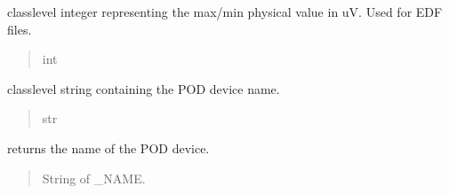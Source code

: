 \documentclass[letterpaper,10pt,english]{sphinxmanual}
\begin{document}
\begin{fulllineitems}
\begin{fulllineitems}
\end{fulllineitems}


\begin{fulllineitems}
\label{\detokenize{Setup_8401HR:Setup_8401HR.Setup_8401HR._PHYSICAL_BOUND_uV}}
\pysigstartsignatures
{}
\pysigstopsignatures
\sphinxAtStartPar
class\sphinxhyphen{}level integer representing the max/\sphinxhyphen{}min physical value in uV. Used for EDF files.
\begin{quote}\begin{description}
\sphinxAtStartPar
int

\end{description}\end{quote}

\end{fulllineitems}


\begin{fulllineitems}
\label{\detokenize{Setup_8401HR:Setup_8401HR.Setup_8401HR._NAME}}
\pysigstartsignatures
{}
\pysigstopsignatures
\sphinxAtStartPar
class\sphinxhyphen{}level string containing the POD device name.
\begin{quote}\begin{description}
\sphinxAtStartPar
str

\end{description}\end{quote}

\end{fulllineitems}


\begin{fulllineitems}
\label{\detokenize{Setup_8401HR:Setup_8401HR.Setup_8401HR.GetDeviceName}}
\pysigstartsignatures
{}
\pysigstopsignatures
\sphinxAtStartPar
returns the name of the POD device.
\begin{quote}\begin{description}
\sphinxAtStartPar
String of \_NAME.


\end{description}
\end{quote}
\end{fulllineitems}
\end{fulllineitems}
\end{document}
